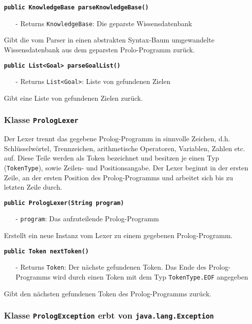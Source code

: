 \documentclass[parskip=full,11pt,twoside]{scrartcl}
\begin{document}
\textbf{\texttt{public KnowledgeBase parseKnowledgeBase()}}
\begin{itemize}[noitemsep]
	\item[-] Returns \texttt{KnowledgeBase}: Die geparste Wissensdatenbank
\end{itemize}
Gibt die vom Parser in einen abstrakten Syntax-Baum umgewandelte Wissensdatenbank aus dem geparsten Prolo-Programm zurück.

\textbf{\texttt{public List<Goal> parseGoalList()}}
\begin{itemize}[noitemsep]
	\item[-] Returns \texttt{List<Goal>}: Liste von gefundenen Zielen
\end{itemize}
Gibt eine Liste von gefundenen Zielen zurück.

\subsubsection{Klasse \texttt{PrologLexer}}

Der Lexer trennt das gegebene Prolog-Programm in sinnvolle Zeichen, d.h. Schlüsselwörtel, Trennzeichen, arithmetische Operatoren, Variablen, Zahlen etc. auf. Diese Teile werden als Token bezeichnet und besitzen je einen Typ (\texttt{TokenType}), sowie Zeilen- und Positionsangabe. Der Lexer beginnt in der ersten Zeile, an der ersten Position des Prolog-Programms und arbeitet sich bis zu letzten Zeile durch.

\textbf{\texttt{public PrologLexer(String program)}}
\begin{itemize}[noitemsep]
	\item[-] \texttt{program}: Das aufzuteilende Prolog-Programm
\end{itemize}
Erstellt ein neue Instanz vom Lexer zu einem gegebenen Prolog-Programm.

\textbf{\texttt{public Token nextToken()}}
\begin{itemize}[noitemsep]
	\item[-] Returns \texttt{Token}: Der nächste gefundenen Token. Das Ende des Prolog-Programms wird durch einen Token mit dem Typ \texttt{TokenType.EOF} angegeben
\end{itemize}
Gibt den nächsten gefundenen Token des Prolog-Programms zurück.

\subsubsection{Klasse \texttt{PrologException} erbt von \texttt{java.lang.Exception}}
\end{document}
